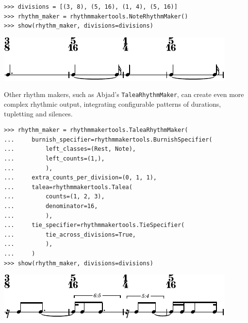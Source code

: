 \documentclass{article}
\begin{document}
\begin{lstlisting}
>>> divisions = [(3, 8), (5, 16), (1, 4), (5, 16)]
>>> rhythm_maker = rhythmmakertools.NoteRhythmMaker()
>>> show(rhythm_maker, divisions=divisions)
\end{lstlisting}
\includegraphics{assets/lilypond-911011fbb23e3c959a67793f30d2d299.pdf}

Other rhythm makers, such as Abjad's \texttt{TaleaRhythmMaker}, can create even
more complex rhythmic output, integrating configurable patterns of durations,
tupletting and silences.

\begin{lstlisting}
>>> rhythm_maker = rhythmmakertools.TaleaRhythmMaker(
...     burnish_specifier=rhythmmakertools.BurnishSpecifier(
...         left_classes=(Rest, Note),
...         left_counts=(1,),
...         ),
...     extra_counts_per_division=(0, 1, 1),
...     talea=rhythmmakertools.Talea(
...         counts=(1, 2, 3),
...         denominator=16,
...         ),
...     tie_specifier=rhythmmakertools.TieSpecifier(
...         tie_across_divisions=True,
...         ),
...     )
>>> show(rhythm_maker, divisions=divisions)
\end{lstlisting}
\includegraphics{assets/lilypond-c0d5041cb91ce3d3e6b94a69fd638cf2.pdf}
\end{document}
